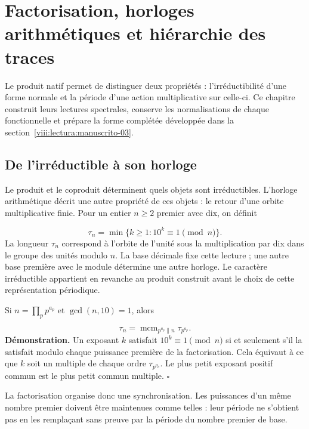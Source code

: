 \section{Factorisation, horloges arithmétiques et hiérarchie des traces}
\label{viii:lectura:manuscrito-02}
Le produit natif permet de distinguer deux propriétés : l'irréductibilité d'une forme normale et la période d'une action multiplicative sur celle-ci. Ce chapitre construit leurs lectures spectrales, conserve les normalisations de chaque fonctionnelle et prépare la forme complétée développée dans la section~\ref{viii:lectura:manuscrito-03}.

\subsection{De l'irréductible à son horloge}
Le produit et le coproduit déterminent quels objets sont irréductibles. L'horloge arithmétique décrit une autre propriété de ces objets : le retour d'une orbite multiplicative finie. Pour un entier $n\ge2$ premier avec dix, on définit

\[
\tau_n=\min\{k\ge1:10^k\equiv1\pmod n\}.
\]
La longueur $\tau_n$ correspond à l'orbite de l'unité sous la multiplication par dix dans le groupe des unités modulo $n$. La base décimale fixe cette lecture ; une autre base première avec le module détermine une autre horloge. Le caractère irréductible appartient en revanche au produit construit avant le choix de cette représentation périodique.

Si $n=\prod_p p^{a_p}$ et $\gcd(n,10)=1$, alors

\[
\tau_n=\operatorname{mcm}_{p^{a_p}\parallel n}\tau_{p^{a_p}}.
\]
\textbf{Démonstration.} Un exposant $k$ satisfait $10^k\equiv1\pmod n$ si et seulement s'il la satisfait modulo chaque puissance première de la factorisation. Cela équivaut à ce que $k$ soit un multiple de chaque ordre $\tau_{p^{a_p}}$. Le plus petit exposant positif commun est le plus petit commun multiple. \hfill\(\square\)

La factorisation organise donc une synchronisation. Les puissances d’un même nombre premier doivent être maintenues comme telles : leur période ne s’obtient pas en les remplaçant sans preuve par la période du nombre premier de base.

